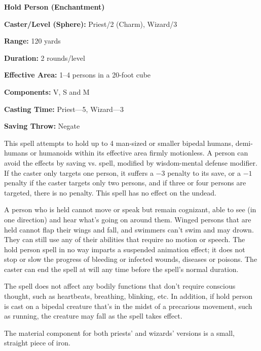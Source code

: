 \begin{multicols}{2}
\begin{minipage}{\columnwidth}
\noindent \textbf{Hold Person (Enchantment)}

\noindent \textbf{Caster/Level (Sphere):} Priest/2 (Charm), Wizard/3

\noindent \textbf{Range:} 120 yards

\noindent \textbf{Duration:} 2 rounds/level

\noindent \textbf{Effective Area:} 1--4 persons in a 20-foot cube

\noindent \textbf{Components:} V, S and M

\noindent \textbf{Casting Time:} Priest---5, Wizard---3

\noindent \textbf{Saving Throw:} Negate

\end{minipage}

This spell attempts to hold up to 4 man-sized or smaller bipedal humans, demi-humans or humanoids within its effective area firmly motionless.  A person can avoid the effects by saving vs. spell, modified by wisdom-mental defense modifier.  If the caster only targets one person, it suffers a $-3$ penalty to its save, or a $-1$ penalty if the caster targets only two persons, and if three or four persons are targeted, there is no penalty.  This spell has no effect on the undead.

A person who is held cannot move or speak but remain cognizant, able to see (in one direction) and hear what's going on around them.  Winged persons that are held cannot flap their wings and fall, and swimmers can't swim and may drown.  They can still use any of their abilities that require no motion or speech.  The hold person spell in no way imparts a suspended animation effect; it does not stop or slow the progress of bleeding or infected wounds, diseases or poisons.  The caster can end the spell at will any time before the spell's normal duration.

The spell does not affect any bodily functions that don't require conscious thought, such as heartbeats, breathing, blinking, etc.  In addition, if hold person is cast on a bipedal creature that's in the midst of a precarious movement, such as running, the creature may fall as the spell takes effect.

The material component for both priests' and wizards' versions is a small, straight piece of iron.
 
\vspace{1em}

\noindent
\begin{minipage}{\columnwidth}


\end{minipage}
\end{multicols}
